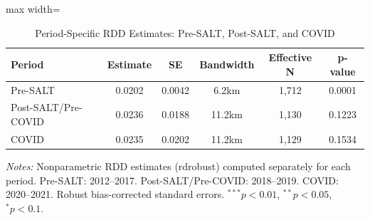 \begin{table}[htbp]
\centering
\caption{Period-Specific RDD Estimates: Pre-SALT, Post-SALT, and COVID}
\label{tab:period_rdd}
\begin{adjustbox}{max width=\textwidth}
\begin{tabular}{lccccc}
  \hline
Period & Estimate & SE & Bandwidth & Effective N & p-value \\ 
  \hline
Pre-SALT & 0.0202 & 0.0042 & 6.2km & 1,712 & 0.0001 \\ 
  Post-SALT/Pre-COVID & 0.0236 & 0.0188 & 11.2km & 1,130 & 0.1223 \\ 
  COVID & 0.0235 & 0.0202 & 11.2km & 1,129 & 0.1534 \\ 
   \hline
\end{tabular}
\end{adjustbox}
\begin{tablenotes}\small
\item \textit{Notes:} Nonparametric RDD estimates (rdrobust) computed separately for each period. Pre-SALT: 2012--2017. Post-SALT/Pre-COVID: 2018--2019. COVID: 2020--2021. Robust bias-corrected standard errors. $^{***}p<0.01$, $^{**}p<0.05$, $^{*}p<0.1$.
\end{tablenotes}
\end{table}
